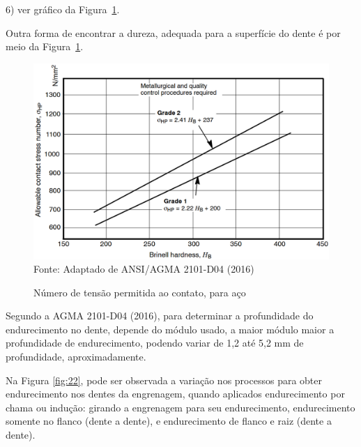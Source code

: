 \documentclass[12pt,a4paper]{article}
\begin{document}
6) ver gráfico da Figura~{\ref{fig:21}}.

Outra forma de encontrar a dureza, adequada para a superfície do dente é
por meio da Figura~{\ref{fig:21}}.

\begin{figure}[!htb]
    \centering
    \caption{Número de tensão permitida ao contato, para aço}
    \includegraphics[scale=0.45]{Imagens/Img21.png}\\
    {\footnotesize Fonte: Adaptado de ANSI/AGMA 2101-D04 (2016)}
    \label{fig:21}
\end{figure}

\par\null

Segundo a AGMA 2101-D04 (2016), para determinar a profundidade do
endurecimento no dente, depende do módulo usado, a maior módulo maior a
profundidade de endurecimento, podendo variar de 1,2 até 5,2 mm de
profundidade, aproximadamente.

Na Figura {\ref{fig:22}}, pode ser observada a variação
nos processos para obter endurecimento nos dentes da engrenagem, quando
aplicados endurecimento por chama ou indução: girando a engrenagem para
seu endurecimento, endurecimento somente no flanco (dente a dente), e
endurecimento de flanco e raiz (dente a dente).
\end{document}
